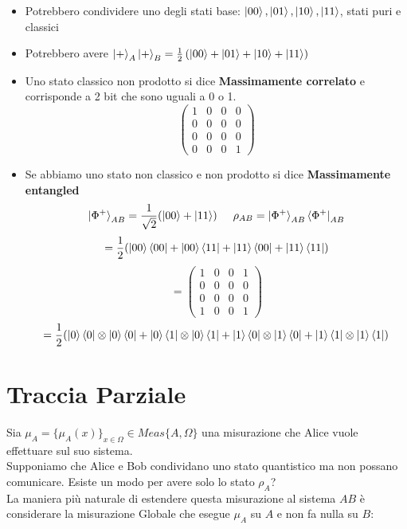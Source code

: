 \documentclass{report}
\begin{document}
\begin{itemize}
    \item Potrebbero condividere uno degli stati base: $\ket{00},\ket{01},\ket{10},\ket{11}$, stati puri e classici
    \item Potrebbero avere $\ket{+}_A\ket{+}_B= \frac{1}{2}\left( \ket{00}+\ket{01}+\ket{10}+\ket{11} \right)$
    \item Uno stato classico non prodotto si dice \textbf{Massimamente correlato} e corrisponde a 2 bit che sono uguali a 0 o 1.
    $$
        \begin{pmatrix}
            1 &0 &0 &0\\
            0 &0 &0 &0\\
            0 &0 &0 &0\\
            0 &0 &0 &1
        \end{pmatrix}
    $$
    \item  Se abbiamo uno stato non classico e non prodotto si dice \textbf{Massimamente entangled} 
    $$\ket{\Phi^+}_{AB}=\frac{1}{\sqrt{2}}(\ket{00}+\ket{11})  \hspace{0.5cm}  \rho_{AB}=\ket{\Phi^+}_{AB}\bra{\Phi^+}_{AB}$$
    $$=\frac{1}{2}(\ket{00}\bra{00}+\ket{00}\bra{11}+\ket{11}\bra{00}+\ket{11}\bra{11})$$
    $$=
        \begin{pmatrix}
            1 & 0 & 0 & 1 \\
            0 & 0 & 0 & 0 \\
            0 & 0 & 0 & 0 \\
            1 & 0 & 0 & 1
        \end{pmatrix}
    $$
    $$=\frac{1}{2}(\ket{0}\bra{0}\otimes\ket{0}\bra{0}+\ket{0}\bra{1}\otimes\ket{0}\bra{1}+\ket{1}\bra{0}\otimes\ket{1}\bra{0}+\ket{1}\bra{1}\otimes\ket{1}\bra{1})$$
\end{itemize}


\section{Traccia Parziale}
Sia $\mu_A=\{\mu_A(x)\}_{x\in\Omega} \in \textit{Meas}\{A,\Omega\}$ una misurazione che Alice vuole effettuare sul suo sistema.\\
Supponiamo che Alice e Bob condividano uno stato quantistico ma non possano comunicare. Esiste un modo per avere solo lo stato $\rho_A$?
\medskip\\
La maniera più naturale di estendere questa misurazione al sistema $AB$ è considerare la misurazione Globale che esegue 
$\mu_A$ su $A$ e non fa nulla su $B$:
\end{document}

